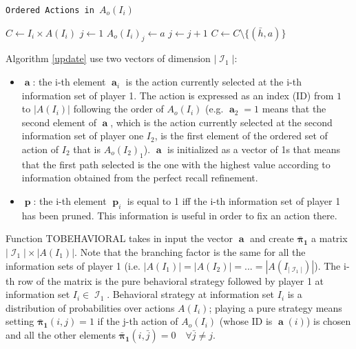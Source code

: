 \documentclass{article}
\DeclareMathOperator*{\I}{\mathcal{I}}
\DeclareMathOperator*{\ag}{\textbf{a}}
\DeclareMathOperator*{\pg}{\textbf{p}}
\begin{document}
\begin{algorithm}[!h]
	\caption{\texttt{Ordered Actions in $A_o(I_i)$}}
	\begin{scriptsize}
		\begin{algorithmic}[1]
			
			
			\State $C \leftarrow I_i \times A(I_i)$
			\State $j \leftarrow 1$
			\State $A_o(I_i)_j \leftarrow a$
			\State $j \leftarrow j+1$
			\State $C \leftarrow C \setminus \{(\bar{h},a)\}$
			\EndFor
			\EndIf
			\EndIf 
			\EndFor
			\EndFunction
			
			
		\end{algorithmic}
	\end{scriptsize}
	\label{ordinare}
\end{algorithm}


\noindent
Algorithm \ref{update} use two vectors of dimension $|\I_1|$:
\begin{itemize}
\item $\ag$: the i-th element $\ag_i$ is the action currently selected at the i-th information set of player 1. The action is expressed as an index (ID) from $1$ to $|A(I_i)|$ following the order of $A_o(I_i)$ (e.g. $\ag_2=1$ means that the second element of $\ag$, which is the action currently selected at the second information set of player one $I_2$, is the first element of the ordered set of action of $I_2$ that is $A_o(I_2)_1$). $\ag$ is initialized as a vector of 1s that means that the first path selected is the one with the highest value according to information obtained from the perfect recall refinement.
\item $\pg$: the i-th element $\pg_i$ is equal to 1 iff the i-th information set of player 1 has been pruned. This information is useful in order to fix an action there. %
\end{itemize}

\noindent
Function TOBEHAVIORAL takes in input the vector $\ag$ and create $\bm{\bar{\pi}_1}$ a matrix $|\I_1| \times |A(I_1)|$. Note that the branching factor is the same for all the information sets of player 1 (i.e. $|A(I_1)|=|A(I_2)|=...=|A(I_{|\I_1|})|$). The i-th row of the matrix is the pure behavioral strategy followed by player 1 at information set $I_i \in \I_1$. Behavioral strategy at information set $I_i$ is a distribution of probabilities over actions $A(I_i)$; playing a pure strategy means setting $\bm{\bar{\pi}_1}(i,j)=1$ if the j-th action of $A_o(I_i)$ (whose ID is $\ag(i)$) is chosen and all the other elements $\bm{\bar{\pi}_1}(i,\bar{j})=0 \quad \forall\bar{j} \ne j$.
\end{document}
